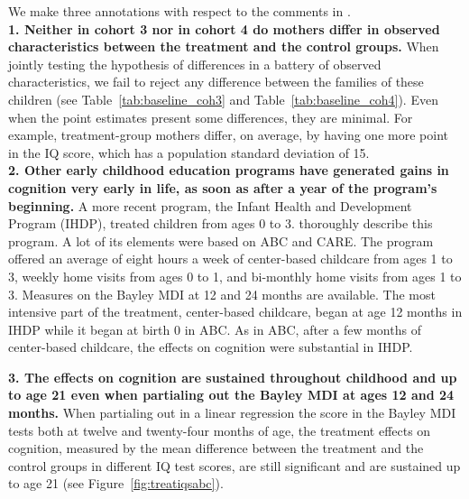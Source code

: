 \noindent We make three annotations with respect to the comments in \citet{}.\\ 

\noindent \textbf{1. Neither in cohort 3 nor in cohort 4 do mothers differ in observed characteristics between the treatment and the control groups.} When jointly testing the hypothesis of differences in a battery of observed characteristics, we fail to reject any difference between the families of these children (see Table~\ref{tab:baseline_coh3} and Table~\ref{tab:baseline_coh4}). Even when the point estimates present some differences, they are minimal. For example, treatment-group mothers differ, on average, by having one more point in the IQ score, which has a population standard deviation of 15.\\

\noindent \textbf{2. Other early childhood education programs have generated gains in cognition very early in life, as soon as after a year of the program's beginning.} A more recent program, the Infant Health and Development Program (IHDP), treated children from ages 0 to 3. \citet{Gross_Spiker_etal_1997_BOOKHelpinglowbirth} thoroughly describe this program. A lot of its elements were based on ABC and CARE. The program offered an average of eight hours a week of center-based childcare from ages 1 to 3, weekly home visits from ages 0 to 1, and bi-monthly home visits from ages 1 to 3. Measures on the Bayley MDI at 12 and 24 months are available. The most intensive part of the treatment, center-based childcare, began at age 12 months in IHDP while it began at birth 0 in ABC. As in ABC, after a few months of center-based childcare, the effects on cognition were substantial in IHDP.


\noindent \textbf{3. The effects on cognition are sustained throughout childhood and up to age 21 even when partialing out the Bayley MDI at ages 12 and 24 months.} When partialing out in a linear regression the score in the Bayley MDI tests both at twelve and twenty-four months of age, the treatment effects on cognition, measured by the mean difference between the treatment and the control groups in different IQ test scores, are still significant and are sustained up to age 21 (see Figure~\ref{fig:treatiqsabc}).

